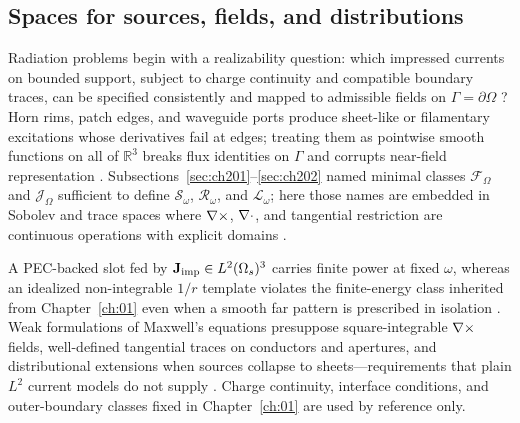 \subsection{Spaces for sources, fields, and distributions}
\label{sec:ch211} 

Radiation problems begin with a realizability question: which impressed currents on
bounded support, subject to charge continuity and compatible boundary traces, can be
specified consistently and mapped to admissible fields on \(\Gamma=\partial\Omega\)
\cite{stratton1941,devaney2004}? Horn rims, patch edges, and waveguide ports produce
sheet-like or filamentary excitations whose derivatives fail at edges; treating them as
pointwise smooth functions on all of \(\mathbb{R}^{3}\) breaks flux identities on
\(\Gamma\) and corrupts near-field representation \cite{harrington2001}. Subsections~\ref{sec:ch201}--\ref{sec:ch202} named minimal classes \(\mathcal{F}_\Omega\) and \(\mathcal{J}_\Omega\) sufficient to define \(\mathcal{S}_\omega\), \(\mathcal{R}_\omega\), and \(\mathcal{L}_\omega\); here those names are embedded in Sobolev and trace spaces where \(\nabla\times\), \(\nabla\cdot\), and tangential restriction are continuous operations with explicit domains \cite{stratton1941}.

A PEC-backed slot fed by \(\mathbf{J}_{\mathrm{imp}}\in L^{2}(\Omega_s)^{3}\) carries finite power at fixed
\(\omega\), whereas an idealized non-integrable \(1/r\) template violates the
finite-energy class inherited from Chapter~\ref{ch:01} even when a smooth far pattern is
prescribed in isolation \cite{stratton1941}. Weak formulations of Maxwell's equations
presuppose square-integrable \(\nabla\times\) fields, well-defined tangential traces on
conductors and apertures, and distributional extensions when sources collapse to
sheets---requirements that plain \(L^{2}\) current models do not supply
\cite{harrington2001}. Charge continuity, interface conditions, and outer-boundary
classes fixed in Chapter~\ref{ch:01} are used by reference only.

